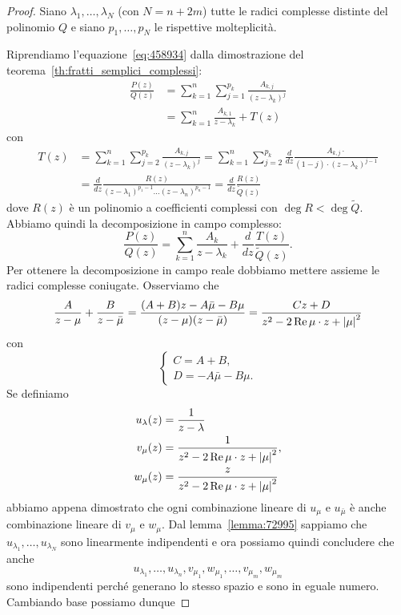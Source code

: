 \begin{proof}
Siano $\lambda_1, \dots, \lambda_N$ (con $N=n+2m$)
tutte le radici complesse distinte del polinomio $Q$
e siano $p_1, \dots, p_N$ le rispettive molteplicità.

Riprendiamo l'equazione~\eqref{eq:458934}
dalla dimostrazione del teorema~\ref{th:fratti_semplici_complessi}:
\begin{align*}
 \frac{P(z)}{Q(z)}
 &= \sum_{k=1}^n \sum_{j=1}^{p_k} \frac{A_{k,j}}{(z-\lambda_k)^j} \\
 &= \sum_{k=1}^n \frac{A_{k,1}}{z-\lambda_k} + T(z)
\end{align*}
con
\begin{align*}
T(z)
&= \sum_{k=1}^n \sum_{j=2}^{p_k} \frac{A_{k,j}}{(z-\lambda_k)^j}
= \sum_{k=1}^n \sum_{j=2}^{p_k} \frac{d}{dz}\frac{A_{k,j}\cdot }{(1-j)\cdot(z-\lambda_k)^{j-1}}\\
& = \frac{d}{dz}\frac{R(z)}{(z-\lambda_1)^{p_1-1}\dots (z-\lambda_n)^{p_n-1}}
  = \frac{d}{dz}\frac{R(z)}{\tilde Q(z)}
\end{align*}
dove $R(z)$ è un polinomio a coefficienti complessi con $\deg R < \deg \tilde Q$.
Abbiamo quindi la decomposizione in campo complesso:
\[
  \frac{P(z)}{Q(z)} = \sum_{k=1}^n \frac{A_k}{z-\lambda_k} + \frac{d}{dz}\frac{T(z)}{\tilde Q(z)}.
\]
Per ottenere la decomposizione in campo reale dobbiamo mettere
assieme le radici complesse coniugate. Osserviamo che
\[
  \frac{A}{z-\mu} + \frac{B}{z-\bar \mu}
  = \frac{(A+B)z - A\bar \mu-B \mu}{(z-\mu)(z-\bar \mu)}
  = \frac{Cz+D}{z^2 -2 \operatorname{Re} \mu\cdot z + {\left|\mu\right|}^2}
\]
con
\[
 \begin{cases}
   C = A+B,\\
   D = -A\bar \mu - B \mu.
 \end{cases}
\]
Se definiamo
\begin{align*}
   u_\lambda(z) &= \frac{1}{z-\lambda}\\
   v_\mu(z) &= \frac{1}{z^2-2 \operatorname{Re} \mu\cdot z + {\left|\mu\right|}^2},\\
   w_\mu(z) &= \frac{z}{z^2-2 \operatorname{Re} \mu\cdot z + {\left|\mu\right|}^2}
\end{align*}
abbiamo appena dimostrato che ogni combinazione lineare
di $u_\mu$ e $u_{\bar \mu}$ è anche combinazione lineare
di $v_\mu$ e $w_\mu$. Dal lemma~\ref{lemma:72995} sappiamo
che $u_{\lambda_1}, \dots, u_{\lambda_N}$ sono linearmente
indipendenti e ora possiamo quindi concludere che
anche
\[
  u_{\lambda_1}, \dots, u_{\lambda_n},
  v_{\mu_1}, w_{\mu_1}, \dots, v_{\mu_m}, w_{\mu_m}
\]
sono indipendenti perché generano lo stesso spazio e sono
in eguale numero. Cambiando base possiamo dunque

\end{proof}
